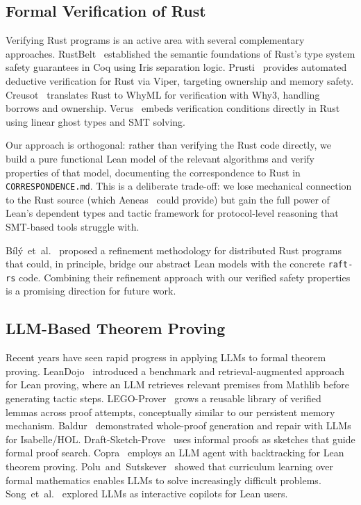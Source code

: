 \documentclass[sigconf,10pt]{acmart}
\begin{document}
\subsection{Formal Verification of Rust}

Verifying Rust programs is an active area with several complementary
approaches.  RustBelt~\cite{jung2018rustbelt} established the
semantic foundations of Rust's type system safety guarantees in Coq
using Iris separation logic.
Prusti~\cite{astrauskas2022prusti} provides automated deductive
verification for Rust via Viper, targeting ownership and memory
safety.
Creusot~\cite{denis2022creusot} translates Rust to WhyML for
verification with Why3, handling borrows and ownership.
Verus~\cite{lattuada2023verus} embeds verification conditions
directly in Rust using linear ghost types and SMT solving.

Our approach is orthogonal: rather than verifying the Rust code
directly, we build a pure functional Lean model of the relevant
algorithms and verify properties of that model, documenting the
correspondence to Rust in \texttt{CORRESPONDENCE.md}.  This is
a deliberate trade-off: we lose mechanical connection to the Rust
source (which Aeneas~\cite{aeneas} could provide) but gain the full
power of Lean's dependent types and tactic framework for
protocol-level reasoning that SMT-based tools struggle with.

B\'il\'y~et~al.~\cite{bily2025rust} proposed a refinement methodology
for distributed Rust programs that could, in principle, bridge our
abstract Lean models with the concrete \texttt{raft-rs} code.
Combining their refinement approach with our verified safety
properties is a promising direction for future work.

\subsection{LLM-Based Theorem Proving}

Recent years have seen rapid progress in applying LLMs to formal
theorem proving.  LeanDojo~\cite{yang2024leandojo} introduced a
benchmark and retrieval-augmented approach for Lean proving, where
an LLM retrieves relevant premises from Mathlib before generating
tactic steps.  LEGO-Prover~\cite{wang2024legoprover} grows a
reusable library of verified lemmas across proof attempts,
conceptually similar to our persistent memory mechanism.
Baldur~\cite{first2023baldur} demonstrated whole-proof generation
and repair with LLMs for Isabelle/HOL.
Draft-Sketch-Prove~\cite{jiang2023dsp} uses informal proofs as
sketches that guide formal proof search.
Copra~\cite{thakur2024copra} employs an LLM agent with
backtracking for Lean theorem proving.
Polu~and~Sutskever~\cite{polu2022formal} showed that curriculum
learning over formal mathematics enables LLMs to solve increasingly
difficult problems.
Song~et~al.~\cite{song2024towards} explored LLMs as interactive
copilots for Lean users.
\end{document}
